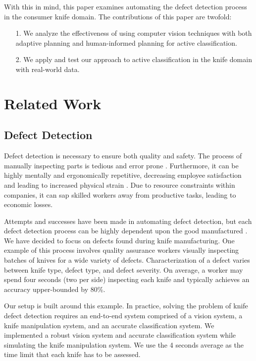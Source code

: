 \documentclass[letterpaper, 10 pt, conference]{ieeeconf}  %
\begin{document}
With this in mind, this paper examines automating the defect detection process in the consumer knife domain. The contributions of this paper are twofold:\\

\begin{enumerate}
	\item[1.] We analyze the effectiveness of using computer vision techniques with both adaptive planning and human-informed planning for active classification.\\
	\item[2.] We apply and test our approach to active classification in the knife domain with real-world data.\\
\end{enumerate}

\section{Related Work}

\subsection{Defect Detection}
Defect detection is necessary to ensure both quality and safety. The process of manually inspecting parts is tedious and error prone \cite{automatedVisionInspection}. Furthermore, it can be highly mentally and ergonomically repetitive, decreasing employee satisfaction and leading to increased physical strain \cite{evans2005management}\cite{eklund1997ergonomics}. Due to resource constraints within companies, it can sap skilled workers away from productive tasks, leading to economic losses.


Attempts and successes have been made in automating defect detection, but each defect detection process can be highly dependent upon the good manufactured \cite{automatedVisionInspection}\cite{defectGabor}\cite{defectSewer}. We have decided to focus on defects found during knife manufacturing. One example of this process involves quality assurance workers visually inspecting batches of knives for a wide variety of defects. Characterization of a defect varies between knife type, defect type, and defect severity. On average, a worker may spend four seconds (two per side) inspecting each knife and typically achieves an accuracy upper-bounded by 80\%.

Our setup is built around this example. In practice, solving the problem of knife defect detection requires an end-to-end system comprised of a vision system, a knife manipulation system, and an accurate classification system. We implemented a robust vision system and accurate classification system while simulating the knife manipulation system. We use the 4 seconds average as the time limit that each knife has to be assessed.
\end{document}

